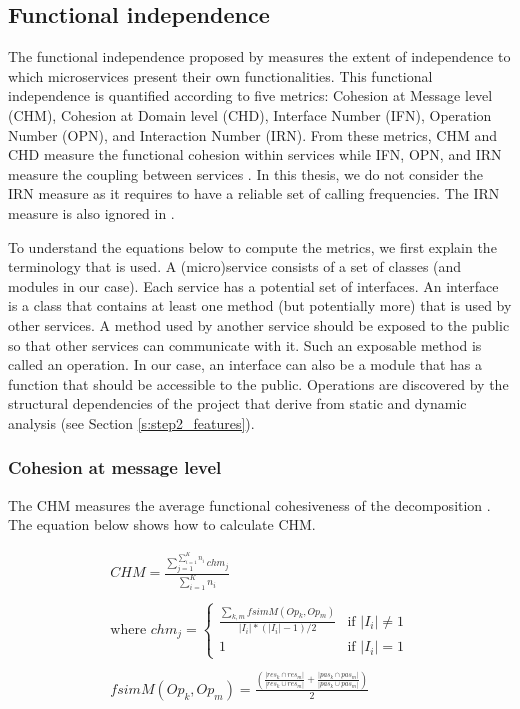 \subsection{Functional independence}\label{ss:functional_independence}
The functional independence proposed by \citeauthor{jin2018functionality} \cite{jin2018functionality} measures the extent of independence to which microservices present their own functionalities. This functional independence is quantified according to five metrics: Cohesion at Message level (CHM), Cohesion at Domain level (CHD), Interface Number (IFN), Operation Number (OPN), and Interaction Number (IRN). From these metrics, CHM and CHD measure the functional cohesion within services while IFN, OPN, and IRN measure the coupling between services \cite{jin2018functionality}. In this thesis, we do not consider the IRN measure as it requires to have a reliable set of calling frequencies. The IRN measure is also ignored in \cite{al2021microservice, brito2021identification, jin2019service}.\par
To understand the equations below to compute the metrics, we first explain the terminology that is used. A (micro)service consists of a set of classes (and modules in our case). Each service has a potential set of interfaces. An interface is a class that contains at least one method (but potentially more) that is used by other services. A method used by another service should be exposed to the public so that other services can communicate with it. Such an exposable method is called an operation. In our case, an interface can also be a module that has a function that should be accessible to the public. Operations are discovered by the structural dependencies of the project that derive from static and dynamic analysis (see Section \ref{s:step2_features}).

\subsubsection{Cohesion at message level}\label{sss:step4_chm}
The CHM measures the average functional cohesiveness of the decomposition \cite{jin2019service}. The equation below shows how to calculate CHM.

\begin{equation}\label{eq:CHM}
    \begin{split}
        CHM = \frac{\sum_{j=1}^{\sum_{i=1}^{K} n_i} chm_j}{\sum_{i=1}^{K} n_i}\\\\
        \text{where  } chm_j = 
        \begin{cases}
            \frac{\sum_{k,m} fsimM(Op_k, Op_m)}{|I_i|*(|I_i|-1)/2} & \text{if } |I_i| \neq 1 \\
            1 & \text{if } |I_i| = 1
        \end{cases} \\\\
        fsimM(Op_k, Op_m) = \frac{(\frac{|res_k \cap res_m|}{|res_k \cup res_m|} + \frac{|pas_k \cap pas_m|}{|pas_k \cup pas_m|})}{2}
    \end{split}
\end{equation}

